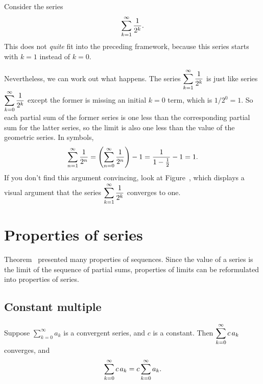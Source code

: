 \begin{example}
Consider the series 
$$\sum_{k=1}^\infty {1\over 2^k}.$$
This does not \textit{quite} fit into the preceding framework, because
this series starts with $k = 1$ instead of $k = 0$.  

Nevertheless, we can work out what happens.  The series
$\displaystyle\sum_{k=1}^\infty {1\over 2^k}$ is just like series
$\displaystyle\sum_{k=0}^\infty \frac{1}{2^k}$ except the former is missing an
initial $k = 0$ term, which is $1/2^0 = 1$.  So each partial sum of
the former series is one less than the corresponding partial sum for
the latter series, so the limit is also one less than the value of the
geometric series.  In symbols,
$$
\sum_{n=1}^\infty {1\over 2^n} = \left( \sum_{n=0}^\infty {1\over 2^n} \right) - 1 = \frac{1}{1 - \frac{1}{2}} - 1 = 1.
$$
If you don't find this argument convincing, look at
Figure~, which displays a
visual argument that the series $\displaystyle\sum_{k=1}^\infty \frac{1}{2^k}$
converges to one.
\end{example}

\section{Properties of series}

Theorem~ presented many properties
of sequences.  Since the value of a series is the limit of the
sequence of partial sums, properties of limits can be reformulated
into properties of series.

\subsection{Constant multiple}

\begin{theorem} \relax\label{thm:series-are-linear-one}
Suppose $\sum_{k=0}^\infty a_k$ is a convergent series, and $c$ is a constant. Then $\displaystyle\sum_{k=0}^\infty c\,a_k$ converges, and
$$\displaystyle\sum_{k=0}^\infty c\,a_k=c\sum_{k=0}^\infty a_k.$$
\end{theorem}

